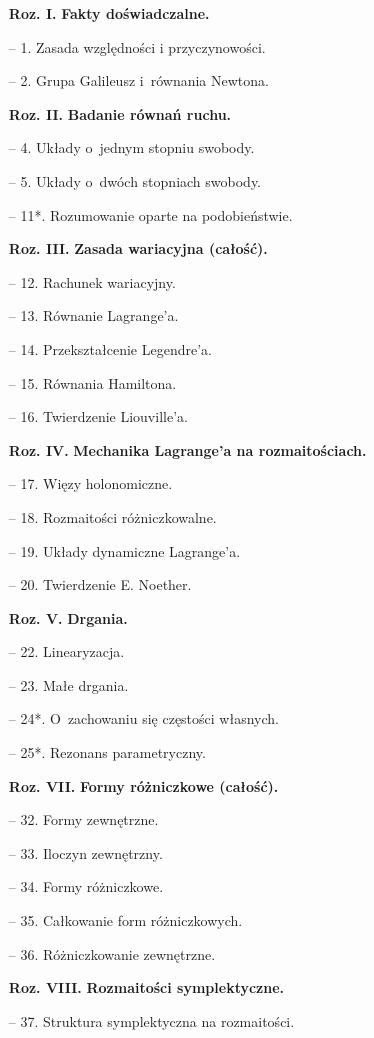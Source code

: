 \documentclass[a4paper,11pt]{article}
\begin{document}
\begin{itemize}
\item[\textbf{Roz. I.}] \textbf{Fakty doświadczalne.}
\item[--] 1. Zasada względności i przyczynowości.
\item[--] 2. Grupa Galileusz i~równania Newtona.
\item[\textbf{Roz. II.}] \textbf{Badanie równań ruchu.}
\item[--] 4. Układy o~jednym stopniu swobody.
\item[--] 5. Układy o~dwóch stopniach swobody.
\item[--] 11*. Rozumowanie oparte na podobieństwie.
\item[\textbf{Roz. III.}] \textbf{Zasada wariacyjna (całość).}
\item[--] 12. Rachunek wariacyjny.
\item[--] 13. Równanie Lagrange'a.
\item[--] 14. Przekształcenie Legendre'a.
\item[--] 15. Równania Hamiltona.
\item[--] 16. Twierdzenie Liouville'a.
\item[\textbf{Roz. IV.}] \textbf{Mechanika Lagrange'a na rozmaitościach.}
\item[--] 17. Więzy holonomiczne.
\item[--] 18. Rozmaitości różniczkowalne.
\item[--] 19. Układy dynamiczne Lagrange'a.
\item[--] 20. Twierdzenie E. Noether.
\item[\textbf{Roz. V.}] \textbf{Drgania.}
\item[--] 22. Linearyzacja.
\item[--] 23. Małe drgania.
\item[--] 24*. O~zachowaniu się częstości własnych.
\item[--] 25*. Rezonans parametryczny.
\item[\textbf{Roz. VII.}] \textbf{Formy różniczkowe (całość).}
\item[--] 32. Formy zewnętrzne.
\item[--] 33. Iloczyn zewnętrzny.
\item[--] 34. Formy różniczkowe.
\item[--] 35. Całkowanie form różniczkowych.
\item[--] 36. Różniczkowanie zewnętrzne.
\item[\textbf{Roz. VIII.}] \textbf{Rozmaitości symplektyczne.}
\item[--] 37. Struktura symplektyczna na rozmaitości.

\end{itemize}
\end{document}

